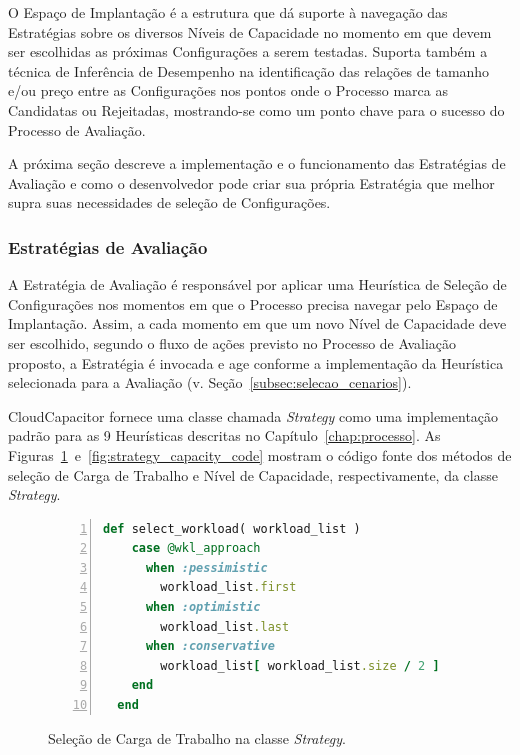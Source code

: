 O Espaço de Implantação é a estrutura que dá suporte à navegação das Estratégias
sobre os diversos Níveis de Capacidade no momento em que devem ser escolhidas
as próximas Configurações a serem testadas. Suporta também a técnica de Inferência 
de Desempenho na identificação das relações de tamanho e/ou preço entre as 
Configurações nos pontos onde o Processo marca as Candidatas ou Rejeitadas, 
mostrando-se como um ponto chave para o sucesso do Processo de Avaliação.

A próxima seção descreve a implementação e o funcionamento das Estratégias de 
Avaliação e como o desenvolvedor pode criar sua própria Estratégia que melhor
supra suas necessidades de seleção de Configurações. 

\subsubsection{Estratégias de Avaliação}
\label{subsubsec:funcionamento_estrategias}
A Estratégia de Avaliação é responsável por aplicar uma Heurística de 
Seleção de Configurações nos momentos em que o Processo precisa navegar
pelo Espaço de Implantação. Assim, a cada momento em que um novo Nível 
de Capacidade deve ser escolhido, segundo o fluxo de ações previsto no 
Processo de Avaliação proposto, a Estratégia é invocada e age conforme 
a implementação da Heurística selecionada para a Avaliação 
(v. Seção~\ref{subsec:selecao_cenarios}).

CloudCapacitor fornece uma classe chamada \emph{Strategy} como uma implementação
padrão para as 9 Heurísticas descritas no Capítulo~\ref{chap:processo}. As
Figuras~\ref{fig:strategy_workload_code}~e~\ref{fig:strategy_capacity_code}
mostram o código fonte dos métodos de seleção de Carga de Trabalho e Nível
de Capacidade, respectivamente, da classe  \emph{Strategy}.

\begin{figure}[t]
  \begin{lstlisting}[language=Ruby,linewidth=\textwidth,xleftmargin=.04\textwidth, numbers=left]
  def select_workload( workload_list )
    case @wkl_approach
      when :pessimistic
        workload_list.first
      when :optimistic
        workload_list.last
      when :conservative
        workload_list[ workload_list.size / 2 ]
    end
  end
  \end{lstlisting}
  \caption{\label{fig:strategy_workload_code}Seleção de Carga de Trabalho na classe \emph{Strategy}.}
\end{figure}

